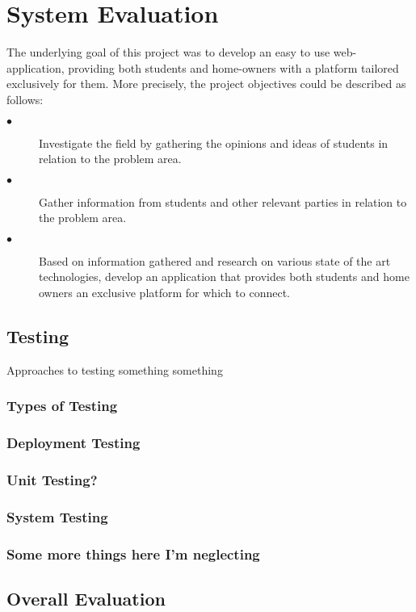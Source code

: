 \chapter{System Evaluation}
The underlying goal of this project was to develop an easy to use web-application, providing both students and home-owners with a platform tailored exclusively for them. More precisely, the project objectives could be described as follows: 

\begin{description}
  \item[$\bullet$] Investigate  the  field  by  gathering  the  opinions  and  ideas  of  students  in relation to the problem area.
  \item[$\bullet$] Gather information from students and other relevant parties in relation to the problem area.
  \item[$\bullet$] Based on information gathered and research on various state of the art technologies, develop an application that provides both students and home owners an exclusive platform for which to connect.
\end{description}

\section{Testing}
Approaches to testing something something
\subsection{Types of Testing}
\subsection{Deployment Testing}
\subsection{Unit Testing?}
\subsection{System Testing}

\subsection{Some more things here I'm neglecting}

\section{Overall Evaluation}
